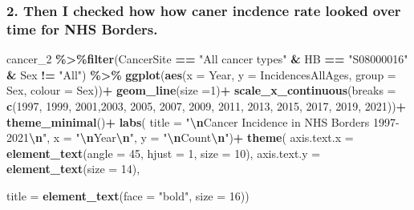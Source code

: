 \documentclass[
]{article}
\newenvironment{Shaded}{\begin{snugshade}}{\end{snugshade}}
\newcommand{\AttributeTok}[1]{\textcolor[rgb]{0.13,0.29,0.53}{#1}}
\newcommand{\DecValTok}[1]{\textcolor[rgb]{0.00,0.00,0.81}{#1}}
\newcommand{\FunctionTok}[1]{\textcolor[rgb]{0.13,0.29,0.53}{\textbf{#1}}}
\newcommand{\NormalTok}[1]{#1}
\newcommand{\SpecialCharTok}[1]{\textcolor[rgb]{0.81,0.36,0.00}{\textbf{#1}}}
\newcommand{\StringTok}[1]{\textcolor[rgb]{0.31,0.60,0.02}{#1}}
\begin{document}
\hypertarget{then-i-checked-how-how-caner-incdence-rate-looked-over-time-for-nhs-borders.}{%
\subsubsection{2. Then I checked how how caner incdence rate looked over
time for NHS
Borders.}\label{then-i-checked-how-how-caner-incdence-rate-looked-over-time-for-nhs-borders.}}

\begin{Shaded}
\begin{Highlighting}[]
\NormalTok{cancer\_2 }\SpecialCharTok{\%\textgreater{}\%}\FunctionTok{filter}\NormalTok{(CancerSite }\SpecialCharTok{==} \StringTok{"All cancer types"} \SpecialCharTok{\&}\NormalTok{ HB }\SpecialCharTok{==} \StringTok{"S08000016"} \SpecialCharTok{\&}\NormalTok{ Sex }\SpecialCharTok{!=} \StringTok{"All"}\NormalTok{) }\SpecialCharTok{\%\textgreater{}\%} 
  \FunctionTok{ggplot}\NormalTok{(}\FunctionTok{aes}\NormalTok{(}\AttributeTok{x =}\NormalTok{ Year, }\AttributeTok{y =}\NormalTok{ IncidencesAllAges, }\AttributeTok{group =}\NormalTok{ Sex, }\AttributeTok{colour =}\NormalTok{ Sex))}\SpecialCharTok{+}
  \FunctionTok{geom\_line}\NormalTok{(}\AttributeTok{size =}\DecValTok{1}\NormalTok{)}\SpecialCharTok{+}
  \FunctionTok{scale\_x\_continuous}\NormalTok{(}\AttributeTok{breaks =} \FunctionTok{c}\NormalTok{(}\DecValTok{1997}\NormalTok{, }\DecValTok{1999}\NormalTok{, }\DecValTok{2001}\NormalTok{,}\DecValTok{2003}\NormalTok{, }\DecValTok{2005}\NormalTok{, }\DecValTok{2007}\NormalTok{, }\DecValTok{2009}\NormalTok{, }\DecValTok{2011}\NormalTok{, }\DecValTok{2013}\NormalTok{, }\DecValTok{2015}\NormalTok{, }\DecValTok{2017}\NormalTok{, }\DecValTok{2019}\NormalTok{, }\DecValTok{2021}\NormalTok{))}\SpecialCharTok{+}
   \FunctionTok{theme\_minimal}\NormalTok{()}\SpecialCharTok{+}
  \FunctionTok{labs}\NormalTok{(}
    \AttributeTok{title =} \StringTok{"}\SpecialCharTok{\textbackslash{}n}\StringTok{Cancer Incidence in NHS Borders 1997{-}2021}\SpecialCharTok{\textbackslash{}n}\StringTok{"}\NormalTok{,}
    \AttributeTok{x =} \StringTok{"}\SpecialCharTok{\textbackslash{}n}\StringTok{Year}\SpecialCharTok{\textbackslash{}n}\StringTok{"}\NormalTok{, }
    \AttributeTok{y =} \StringTok{"}\SpecialCharTok{\textbackslash{}n}\StringTok{Count}\SpecialCharTok{\textbackslash{}n}\StringTok{"}\NormalTok{)}\SpecialCharTok{+}
  \FunctionTok{theme}\NormalTok{(}
    \AttributeTok{axis.text.x =} \FunctionTok{element\_text}\NormalTok{(}\AttributeTok{angle =} \DecValTok{45}\NormalTok{, }\AttributeTok{hjust =} \DecValTok{1}\NormalTok{, }\AttributeTok{size =} \DecValTok{10}\NormalTok{),}
  \AttributeTok{axis.text.y =} \FunctionTok{element\_text}\NormalTok{(}\AttributeTok{size =} \DecValTok{14}\NormalTok{),}
    
    \AttributeTok{title =} \FunctionTok{element\_text}\NormalTok{(}\AttributeTok{face =} \StringTok{"bold"}\NormalTok{, }\AttributeTok{size =} \DecValTok{16}\NormalTok{))}
\end{Highlighting}
\end{Shaded}
\end{document}
